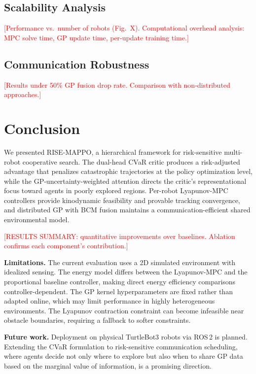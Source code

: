 \documentclass[letterpaper]{IEEEtran}
\begin{document}
\subsection{Scalability Analysis}
\textcolor{red}{[Performance vs.\ number of robots (Fig.~X). Computational overhead analysis: MPC solve time, GP update time, per-update training time.]}

\subsection{Communication Robustness}
\textcolor{red}{[Results under 50\% GP fusion drop rate. Comparison with non-distributed approaches.]}

\section{Conclusion}
\label{sec:conclusion}

We presented RISE-MAPPO, a hierarchical framework for risk-sensitive multi-robot cooperative search. The dual-head CVaR critic produces a risk-adjusted advantage that penalizes catastrophic trajectories at the policy optimization level, while the GP-uncertainty-weighted attention directs the critic's representational focus toward agents in poorly explored regions. Per-robot Lyapunov-MPC controllers provide kinodynamic feasibility and provable tracking convergence, and distributed GP with BCM fusion maintains a communication-efficient shared environmental model.

\textcolor{red}{[RESULTS SUMMARY: quantitative improvements over baselines. Ablation confirms each component's contribution.]}

\textbf{Limitations.} The current evaluation uses a 2D simulated environment with idealized sensing. The energy model differs between the Lyapunov-MPC and the proportional baseline controller, making direct energy efficiency comparisons controller-dependent. The GP kernel hyperparameters are fixed rather than adapted online, which may limit performance in highly heterogeneous environments. The Lyapunov contraction constraint can become infeasible near obstacle boundaries, requiring a fallback to softer constraints.

\textbf{Future work.} Deployment on physical TurtleBot3 robots via ROS\,2 is planned. Extending the CVaR formulation to risk-sensitive communication scheduling, where agents decide not only where to explore but also when to share GP data based on the marginal value of information, is a promising direction.
\end{document}
